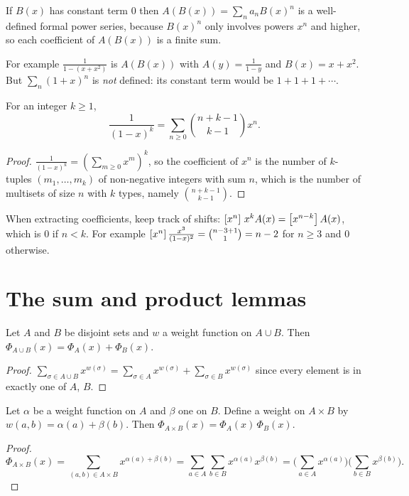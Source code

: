 \begin{definition}[Composition]
If $B(x)$ has constant term $0$ then $A(B(x)) = \sum_n a_n B(x)^n$ is a well-defined formal
power series, because $B(x)^n$ only involves powers $x^n$ and higher, so each coefficient of
$A(B(x))$ is a finite sum.
\end{definition}

For example $\frac{1}{1 - (x + x^2)}$ is $A(B(x))$ with $A(y) = \frac{1}{1-y}$ and
$B(x) = x + x^2$. But $\sum_n (1+x)^n$ is \emph{not} defined: its constant term would be
$1 + 1 + 1 + \cdots$.

\begin{theorem}
For an integer $k \ge 1$,
\[
\frac{1}{(1-x)^k} = \sum_{n \ge 0} \binom{n+k-1}{k-1} x^n.
\]
\end{theorem}
\begin{proof}
$\frac{1}{(1-x)^k} = \left(\sum_{m \ge 0} x^m\right)^k$, so the coefficient of $x^n$ is the
number of $k$-tuples $(m_1,\dots,m_k)$ of non-negative integers with sum $n$, which is the
number of multisets of size $n$ with $k$ types, namely $\binom{n+k-1}{k-1}$.
\end{proof}

\begin{important}
When extracting coefficients, keep track of shifts: $\left[x^{n}\right]\, x^k A(x) = \left[x^{n-k}\right] A(x)$,
which is $0$ if $n < k$. For example $\left[x^{n}\right] \frac{x^3}{(1-x)^2} = \binom{n-3+1}{1} = n-2$
for $n \ge 3$ and $0$ otherwise.
\end{important}

\section{The sum and product lemmas}

\begin{lemma}
Let $A$ and $B$ be disjoint sets and $w$ a weight function on $A \cup B$. Then
$\Phi_{A \cup B}(x) = \Phi_A(x) + \Phi_B(x)$.
\end{lemma}
\begin{proof}
$\sum_{\sigma \in A \cup B} x^{w(\sigma)} = \sum_{\sigma \in A} x^{w(\sigma)} +
\sum_{\sigma \in B} x^{w(\sigma)}$ since every element is in exactly one of $A$, $B$.
\end{proof}

\begin{lemma}
Let $\alpha$ be a weight function on $A$ and $\beta$ one on $B$. Define a weight on $A\times B$
by $w(a,b) = \alpha(a) + \beta(b)$. Then $\Phi_{A\times B}(x) = \Phi_A(x)\,\Phi_B(x)$.
\end{lemma}
\begin{proof}
\[
\Phi_{A \times B}(x) = \sum_{(a,b)\in A\times B} x^{\alpha(a) + \beta(b)}
= \sum_{a \in A}\sum_{b\in B} x^{\alpha(a)}x^{\beta(b)}
= \Big(\sum_{a\in A} x^{\alpha(a)}\Big)\Big(\sum_{b \in B} x^{\beta(b)}\Big).
\]
\end{proof}

